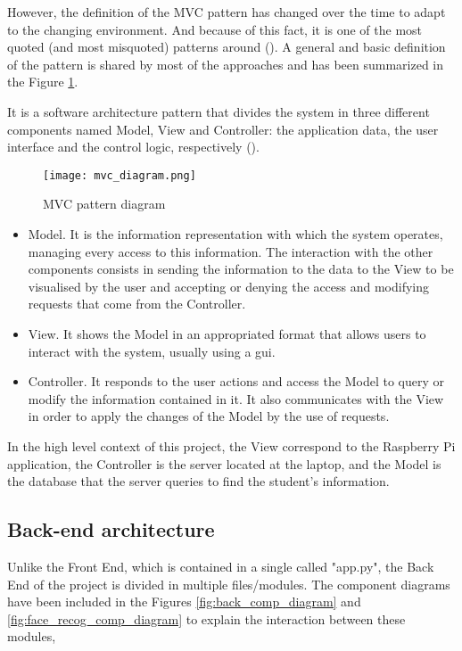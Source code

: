 However, the definition of the MVC pattern has changed over the time to adapt to the changing environment. And because of this fact, it is one of the most quoted (and most misquoted) patterns around (\cite{current_mvc_definition}). A general and basic definition of the pattern is shared by most of the approaches and has been summarized in the Figure \ref{fig:mvc_diagram}.   

\clearpage

It is a software architecture pattern that divides the system in three different components named Model, View and Controller: the application data, the user interface and the control logic, respectively (\cite{mvc_components_definition}).

\begin{figure}[!ht]
	\centering
	\texttt{[image: mvc\_diagram.png]}
	\caption{MVC pattern diagram}
	\label{fig:mvc_diagram}
\end{figure}	

\begin{itemize}
	\item Model. It is the information representation with which the system operates, managing every access to this information. The interaction with the other components consists in 	sending the information to the data to the View to be visualised by the user and accepting or denying the access and modifying requests that come from the Controller.
	\item View. It shows the Model in an appropriated format that allows users to interact with the system, usually using a \gls{gui}.
	\item Controller. It responds to the user actions and access the Model to query or modify the information contained in it. It also communicates with the View in order to apply the changes of the Model by the use of requests. 
\end{itemize}

In the high level context of this project, the View correspond to the Raspberry Pi application, the Controller is the server located at the laptop, and the Model is the database that the server queries to find the student's information. 

	\subsection{Back-end architecture}
	Unlike the Front End, which is contained in a single called "app.py", the Back End of the project is divided in multiple files/modules. The component diagrams have been included in the Figures \ref{fig:back_comp_diagram} and \ref{fig:face_recog_comp_diagram} to explain the interaction between these modules, 

